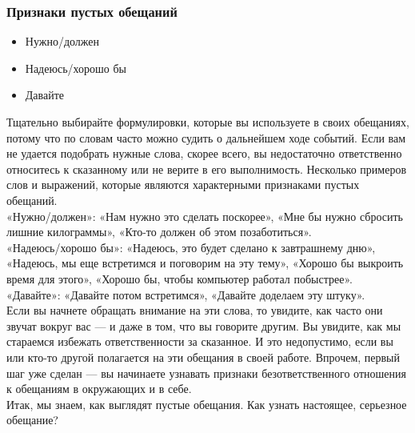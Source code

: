 \documentclass{../industrial-development}
\begin{document}
\begin{frame} \frametitle{Признаки пустых обещаний}
\begin{itemize}
	\item Нужно/должен
	\item Надеюсь/хорошо бы
	\item Давайте
\end{itemize}
\end{frame}
\lecturenotes
Тщательно выбирайте формулировки, которые вы используете в своих обещаниях, потому что по словам часто можно судить о дальнейшем ходе событий. Если вам не удается подобрать нужные слова, скорее всего, вы недостаточно ответственно относитесь к сказанному или не верите в его выполнимость. Несколько примеров слов и выражений, которые являются характерными признаками пустых обещаний.\\
«Нужно/должен»: «Нам нужно это сделать поскорее», «Мне бы нужно сбросить лишние килограммы», «Кто-то должен об этом позаботиться».\\
«Надеюсь/хорошо бы»: «Надеюсь, это будет сделано к завтрашнему дню», «Надеюсь, мы еще встретимся и поговорим на эту тему», «Хорошо бы выкроить время для этого», «Хорошо бы, чтобы компьютер работал побыстрее».\\
«Давайте»: «Давайте потом встретимся», «Давайте доделаем эту штуку».\\
Если вы начнете обращать внимание на эти слова, то увидите, как часто они звучат вокруг вас — и даже в том, что вы говорите другим. Вы увидите, как мы стараемся избежать ответственности за сказанное. И это недопустимо, если вы или кто-то другой полагается на эти обещания в своей работе. Впрочем, первый шаг уже сделан — вы начинаете узнавать признаки безответственного отношения к обещаниям в окружающих и в себе.\\
Итак, мы знаем, как выглядят пустые обещания. Как узнать настоящее, серьезное обещание?
\end{document}

